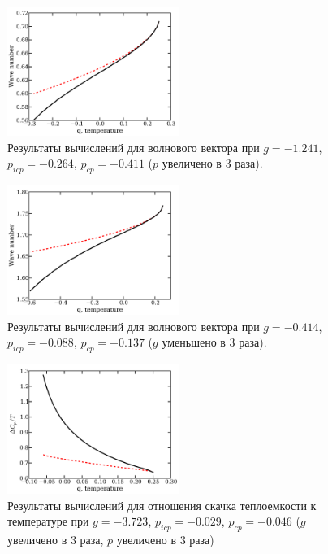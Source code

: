 \begin{figure}\label{fig:px3-wn}
\includegraphics[width = 0.5\textwidth]{figs/px3-wn.pdf}
\caption{Результаты вычислений для волнового вектора при $g= -1.241$, $p_{icp}= -0.264$, $p_{cp}=-0.411$ ($p$ увеличено в 3 раза).}
\end{figure}

\begin{figure}\label{fig:g_3-wn}
\includegraphics[width = 0.5\textwidth]{figs/g_3-wn.pdf}
\caption{Результаты вычислений для волнового вектора при $g= -0.414$, $p_{icp}= -0.088$, $p_{cp}=-0.137$ ($g$ уменьшено в 3 раза).}
\end{figure}

\begin{figure}\label{fig:gx3px3-cpt}
\includegraphics[width = 0.5\textwidth]{figs/gx3px3-cpt.pdf}
\caption{Результаты вычислений для отношения скачка теплоемкости к температуре при $g= -3.723$, $p_{icp}= -0.029$, $p_{cp}=-0.046$ ($g$ увеличено в 3 раза, $p$ увеличено в 3 раза)}
\end{figure}

